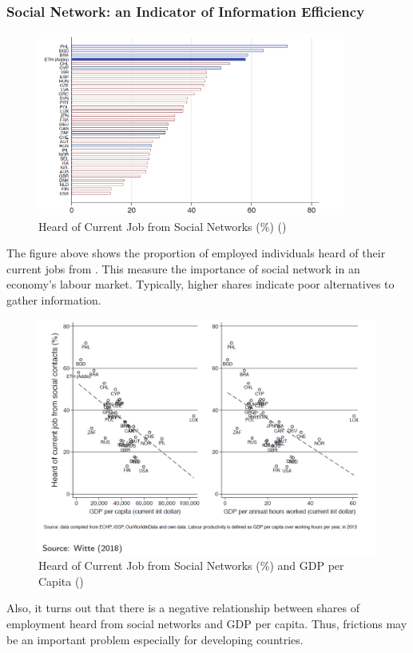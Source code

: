         \subsubsection{Social Network: an Indicator of Information Efficiency}
            \begin{figure}[H]
                \centering
                \includegraphics[width=4in]{images/ch6/social networks.png}
                \caption{Heard of Current Job from Social Networks (\%) (\cite{witte_job_2018})}
            \end{figure}
            The figure above shows the proportion of employed individuals heard of their current jobs from . This measure the importance of social network in an economy's labour market. Typically, higher shares indicate poor alternatives to gather information.
            \begin{figure}[H]
                \centering
                \includegraphics[width=5in]{images/ch6/social networks and gdp per capita.png}
                \caption{Heard of Current Job from Social Networks (\%) and GDP per Capita (\cite{witte_job_2018})}
            \end{figure}
            Also, it turns out that there is a negative relationship between shares of employment heard from social networks and GDP per capita. Thus, frictions may be an important problem especially for developing countries.
            
